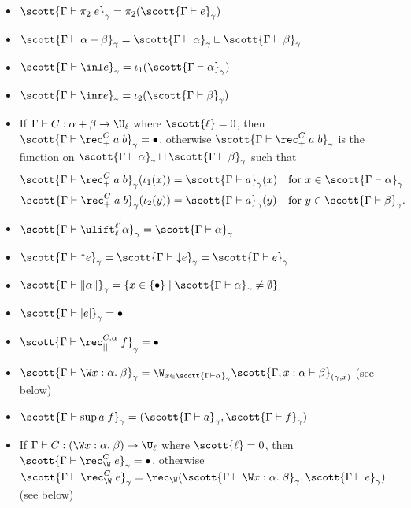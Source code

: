\begin{itemize}
\item $\scott{\Gamma\vdash\pi_2\;e}_\gamma=\pi_2(\scott{\Gamma\vdash e}_\gamma)$
\item $\scott{\Gamma\vdash\alpha+\beta}_\gamma=\scott{\Gamma\vdash\alpha}_\gamma\sqcup\scott{\Gamma\vdash\beta}_\gamma$
\item $\scott{\Gamma\vdash\inl e}_\gamma=\iota_1(\scott{\Gamma\vdash\alpha}_\gamma)$
\item $\scott{\Gamma\vdash\inr e}_\gamma=\iota_2(\scott{\Gamma\vdash\beta}_\gamma)$
\item If $\Gamma\vdash C:\alpha+\beta\to\U_\ell$ where $\scott{\ell}=0$, then $\scott{\Gamma\vdash\rec_+^C\;a\;b}_\gamma=\bullet$, otherwise $\scott{\Gamma\vdash\rec_+^C\;a\;b}_\gamma$ is the function on $\scott{\Gamma\vdash\alpha}_\gamma\sqcup\scott{\Gamma\vdash\beta}_\gamma$ such that
\begin{align*}
\scott{\Gamma\vdash\rec_+^C\;a\;b}_\gamma(\iota_1(x))&=\scott{\Gamma\vdash a}_\gamma(x)&&\mbox{for }x\in \scott{\Gamma\vdash\alpha}_\gamma\\
\scott{\Gamma\vdash\rec_+^C\;a\;b}_\gamma(\iota_2(y))&=\scott{\Gamma\vdash a}_\gamma(y)&&\mbox{for }y\in \scott{\Gamma\vdash\beta}_\gamma.
\end{align*}
\item $\scott{\Gamma\vdash\ulift_\ell^{\ell'} \alpha}_\gamma=\scott{\Gamma\vdash\alpha}_\gamma$
\item $\scott{\Gamma\vdash{\uparrow}e}_\gamma=\scott{\Gamma\vdash{\downarrow}e}_\gamma=\scott{\Gamma\vdash e}_\gamma$
\item $\scott{\Gamma\vdash\|\alpha\|}_\gamma=\{x\in\{\bullet\}\mid\scott{\Gamma\vdash\alpha}_\gamma\ne \emptyset\}$
\item $\scott{\Gamma\vdash|e|}_\gamma=\bullet$
\item $\scott{\Gamma\vdash\rec_{||}^{C,\alpha}\;f}_\gamma=\bullet$
\item $\scott{\Gamma\vdash\W x:\alpha.\;\beta}_\gamma=\W_{x\in\scott{\Gamma\vdash\alpha}_\gamma}\scott{\Gamma,x:\alpha\vdash\beta}_{(\gamma,x)}$ (see below)
\item $\scott{\Gamma\vdash\sup a\;f}_\gamma=(\scott{\Gamma\vdash a}_\gamma,\scott{\Gamma\vdash f}_\gamma)$
\item If $\Gamma\vdash C:(\W x:\alpha.\;\beta)\to\U_\ell$ where $\scott{\ell}=0$, then $\scott{\Gamma\vdash\rec_\W^C\;e}_\gamma=\bullet$, otherwise $\scott{\Gamma\vdash\rec_\W^C\;e}_\gamma=\rec_\W(\scott{\Gamma\vdash\W x:\alpha.\;\beta}_\gamma,\scott{\Gamma\vdash e}_\gamma)$ (see below)

\end{itemize}
